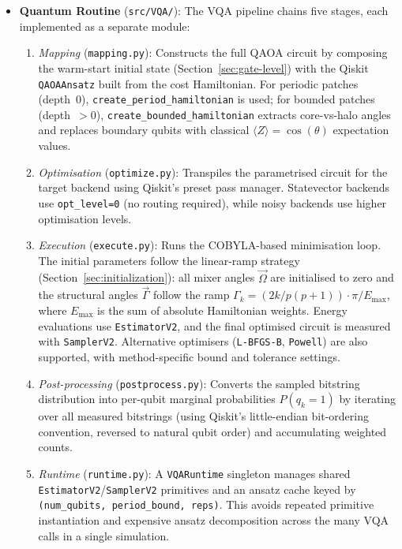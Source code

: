 \documentclass[12pt, a4paper, oneside]{report}
\begin{document}
\begin{itemize}
    \item \textbf{Quantum Routine} (\texttt{src/VQA/}): The VQA pipeline chains five stages, each implemented as a separate module:
    \begin{enumerate}
        \item \textit{Mapping} (\texttt{mapping.py}): Constructs the full QAOA circuit by composing the warm-start initial state (Section~\ref{sec:gate-level}) with the Qiskit \texttt{QAOAAnsatz} built from the cost Hamiltonian. For periodic patches (depth~0), \texttt{create\_period\_hamiltonian} is used; for bounded patches (depth~$>0$), \texttt{create\_bounded\_hamiltonian} extracts core-vs-halo angles and replaces boundary qubits with classical $\langle Z \rangle = \cos(\theta)$ expectation values.
        \item \textit{Optimisation} (\texttt{optimize.py}): Transpiles the parametrised circuit for the target backend using Qiskit's preset pass manager. Statevector backends use \texttt{opt\_level=0} (no routing required), while noisy backends use higher optimisation levels.
        \item \textit{Execution} (\texttt{execute.py}): Runs the COBYLA-based minimisation loop. The initial parameters follow the linear-ramp strategy (Section~\ref{sec:initialization}): all mixer angles $\vec{\Omega}$ are initialised to zero and the structural angles $\vec{\Gamma}$ follow the ramp $\Gamma_k = (2k / p(p+1)) \cdot \pi / E_{\max}$, where $E_{\max}$ is the sum of absolute Hamiltonian weights. Energy evaluations use \texttt{EstimatorV2}, and the final optimised circuit is measured with \texttt{SamplerV2}. Alternative optimisers (\texttt{L-BFGS-B}, \texttt{Powell}) are also supported, with method-specific bound and tolerance settings.
        \item \textit{Post-processing} (\texttt{postprocess.py}): Converts the sampled bitstring distribution into per-qubit marginal probabilities $P(q_k = 1)$ by iterating over all measured bitstrings (using Qiskit's little-endian bit-ordering convention, reversed to natural qubit order) and accumulating weighted counts.
        \item \textit{Runtime} (\texttt{runtime.py}): A \texttt{VQARuntime} singleton manages shared\\ \texttt{EstimatorV2}/\texttt{SamplerV2} primitives and an ansatz cache keyed by \texttt{(num\_qubits, period\_bound, reps)}. This avoids repeated primitive instantiation and expensive ansatz decomposition across the many VQA calls in a single simulation.
    \end{enumerate}

\end{itemize}
\end{document}
